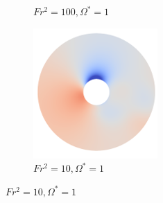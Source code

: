 \begin{figure}
\begin{subfigure}[b]{0.25\textwidth}
        \caption{$Fr^2 = 100, \Omega^{\ast} = 1$}
        \label{ps1fs100}
    \end{subfigure}
    \hfill
    \begin{subfigure}[b]{0.25\textwidth}
        \centering
        \includegraphics[width=\textwidth]{images/circle/ps1fs10.png}
        \caption{$Fr^2 = 10, \Omega^{\ast} = 1$}
        \label{fig:ps1fs10}
    \end{subfigure}


\end{figure}
